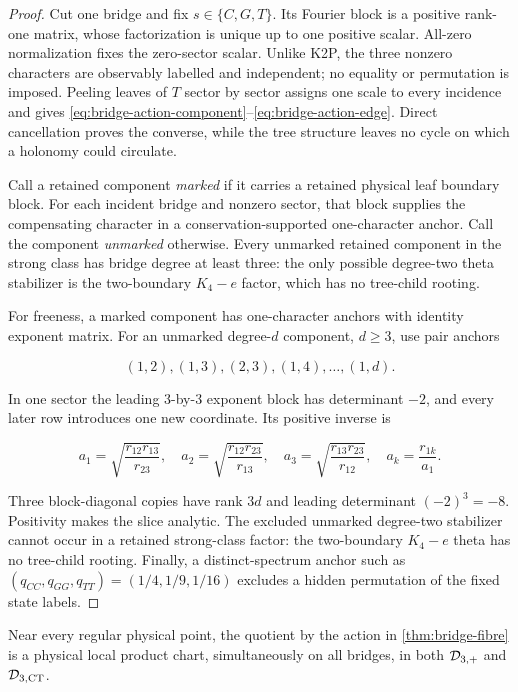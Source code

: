 \begin{proof}
Cut one bridge and fix \(s\in\{C,G,T\}\).  Its Fourier block is a positive
rank-one matrix, whose factorization is unique up to one positive scalar.
All-zero normalization fixes the zero-sector scalar.  Unlike K2P, the three
nonzero characters are observably labelled and independent; no equality or
permutation is imposed.  Peeling leaves of \(T\) sector by sector assigns one
scale to every incidence and gives
\eqref{eq:bridge-action-component}--\eqref{eq:bridge-action-edge}.  Direct
cancellation proves the converse, while the tree structure leaves no cycle
on which a holonomy could circulate.

Call a retained component \emph{marked} if it carries a retained physical
leaf boundary block.  For each incident bridge and nonzero sector, that block
supplies the compensating character in a conservation-supported
one-character anchor.  Call the component \emph{unmarked} otherwise.  Every
unmarked retained component in the strong class has bridge degree at least
three: the only possible degree-two theta stabilizer is the two-boundary
\(K_4-e\) factor, which has no tree-child rooting.

For freeness, a marked component has one-character anchors with identity
exponent matrix.  For an unmarked degree-\(d\) component, \(d\ge3\), use pair
anchors

\[
 (1,2),(1,3),(2,3),(1,4),\ldots,(1,d).
\]

In one sector the leading \(3\)-by-\(3\) exponent block has determinant
\(-2\), and every later row introduces one new coordinate.  Its positive
inverse is

\begin{equation}\label{eq:bridge-normalizer}
 a_1=\sqrt{\frac{r_{12}r_{13}}{r_{23}}},\quad
 a_2=\sqrt{\frac{r_{12}r_{23}}{r_{13}}},\quad
 a_3=\sqrt{\frac{r_{13}r_{23}}{r_{12}}},\quad
 a_k=\frac{r_{1k}}{a_1}.
\end{equation}

Three block-diagonal copies have rank \(3d\) and leading determinant
\((-2)^3=-8\).  Positivity makes the slice analytic.  The excluded unmarked
degree-two stabilizer cannot occur in a retained strong-class factor: the
two-boundary \(K_4-e\) theta has no tree-child rooting.  Finally, a
distinct-spectrum anchor such as
\((q_{CC},q_{GG},q_{TT})=(1/4,1/9,1/16)\) excludes a hidden permutation of
the fixed state labels.
\end{proof}

\begin{lemma}\label{lem:physical-product}
Near every regular physical point, the quotient by the action in
\cref{thm:bridge-fibre} is a physical local product chart, simultaneously on
all bridges, in both \(\mathcal D_{3,+}\) and \(\mathcal D_{3,\mathrm{CT}}\).
\end{lemma}

